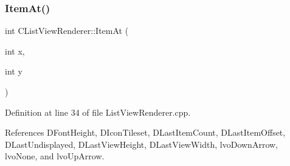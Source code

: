 \subsubsection{\texorpdfstring{Item\+At()}{ItemAt()}}
{\footnotesize\ttfamily int C\+List\+View\+Renderer\+::\+Item\+At (\begin{DoxyParamCaption}\item[{int}]{x,  }\item[{int}]{y }\end{DoxyParamCaption})}



Definition at line 34 of file List\+View\+Renderer.\+cpp.



References D\+Font\+Height, D\+Icon\+Tileset, D\+Last\+Item\+Count, D\+Last\+Item\+Offset, D\+Last\+Undisplayed, D\+Last\+View\+Height, D\+Last\+View\+Width, lvo\+Down\+Arrow, lvo\+None, and lvo\+Up\+Arrow.


